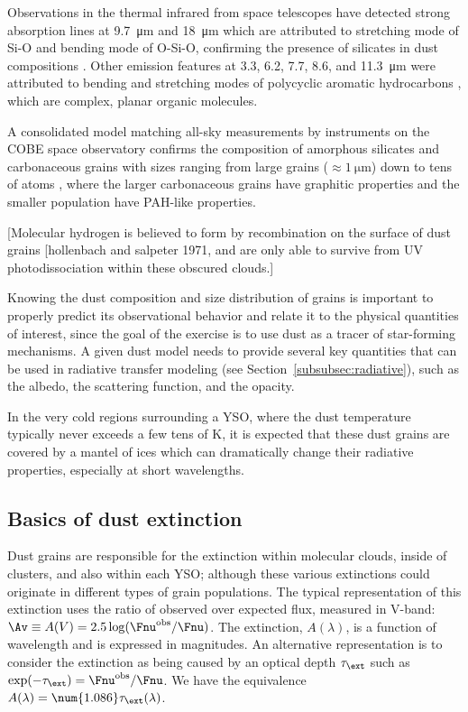 Observations in the thermal infrared from space telescopes have detected strong absorption lines at \SI{9.7}{\micro\meter} and \SI{18}{\micro\meter} which are attributed to stretching mode of Si-O and bending mode of O-Si-O, confirming the presence of silicates in dust compositions \citep{Weingartner:2001du}. Other emission features at 3.3, 6.2, 7.7, 8.6, and \SI{11.3}{\micro\meter} \citep{Sellgren:1994vz} were attributed to bending and stretching modes of polycyclic aromatic hydrocarbons \citep[PAH, see][]{Gillett:1973bh,Allamandola:1985cf}, which are complex, planar organic molecules.
 
A consolidated model matching all-sky measurements by instruments on the COBE space observatory confirms the composition of amorphous silicates and carbonaceous grains with sizes ranging from large grains ($\approx\SI{1}{\micro\meter}$) down to tens of atoms \citep{Li:2001gk}, where the larger carbonaceous grains have graphitic properties and the smaller population have PAH-like properties.


[Molecular hydrogen is believed to form by recombination on the surface of dust grains [hollenbach and salpeter 1971, and are only able to survive from UV photodissociation within these obscured clouds.]




Knowing the dust composition and size distribution of grains is important to properly predict its observational behavior and relate it to the physical quantities of interest, since the goal of the exercise is to use dust as a tracer of star-forming mechanisms. A given dust model needs to provide several key quantities that can be used in radiative transfer modeling (see Section~\ref{subsubsec:radiative}), such as the albedo, the scattering function, and the opacity.

In the very cold regions surrounding a YSO, where the dust temperature typically never exceeds a few tens of \si{\kelvin}, it is expected that these dust grains are covered by a mantel of ices which can dramatically change their radiative properties, especially at short wavelengths. 

\subsection{Basics of dust extinction}

Dust grains are responsible for the extinction within molecular clouds, inside of clusters, and also within each YSO; although these various extinctions could originate in different types of grain populations. The typical representation of this extinction uses the ratio of observed over expected flux, measured in V-band: $\Av \equiv A(V) = 2.5\log(\Fnu^\textrm{obs}/\Fnu)$. The extinction, $A(\lambda)$, is a function of wavelength and is expressed in magnitudes. An alternative representation is to consider the extinction as being caused by an optical depth $\tau_\ext$ such as $\exp(-\tau_\ext) = \Fnu^\textrm{obs}/\Fnu$. We have the equivalence $A(\lambda) = \num{1.086}\tau_\ext(\lambda)$.

